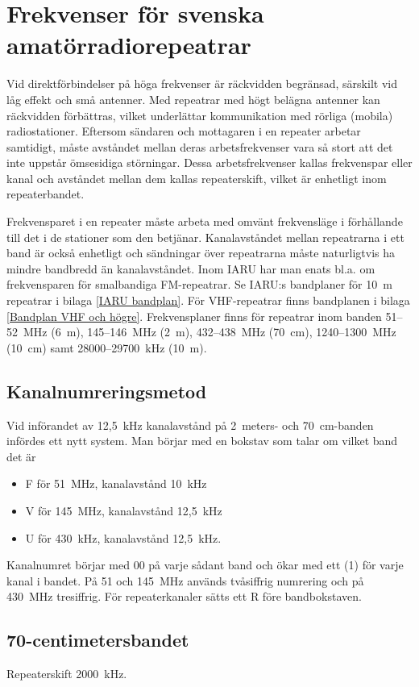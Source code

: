 \chapter[Svenska repeatrar]{Frekvenser för svenska amatörradiorepeatrar}
\label{svenska repeatrar}

Vid direktförbindelser på höga frekvenser är räckvidden begränsad,
särskilt vid låg effekt och små antenner.
Med repeatrar med högt belägna antenner kan räckvidden förbättras,
vilket underlättar kommunikation med rörliga (mobila) radiostationer.
Eftersom sändaren och mottagaren i en repeater arbetar samtidigt, måste
avståndet mellan deras arbetsfrekvenser vara så stort att det inte uppstår
ömsesidiga störningar.
Dessa arbetsfrekvenser kallas frekvenspar eller kanal och avståndet mellan dem
kallas repeaterskift, vilket är enhetligt inom repeaterbandet.

Frekvensparet i en repeater måste arbeta med omvänt frekvensläge i förhållande
till det i de stationer som den betjänar.
Kanalavståndet mellan repeatrarna i ett band är också enhetligt och sändningar
över repeatrarna måste naturligtvis ha mindre bandbredd än kanalavståndet.
Inom IARU har man enats bl.a. om frekvensparen för smalbandiga FM-repeatrar.
Se IARU:s bandplaner för 10~m repeatrar i bilaga \ref{IARU bandplan}.
För VHF-repeatrar finns bandplanen i bilaga \ref{Bandplan VHF och högre}.
Frekvensplaner finns för repeatrar inom banden 51--52~MHz (6~m), 145--146~MHz
(2~m), 432--438~MHz (70~cm), 1240--1300~MHz (10~cm) samt 28000--29700~kHz (10~m).

\section{Kanalnumreringsmetod}
Vid införandet av 12,5~kHz kanalavstånd på 2~meters- och 70~cm-banden infördes
ett nytt system.
Man börjar med en bokstav som talar om vilket band det är
\begin{itemize}
  \item F för 51~MHz, kanalavstånd 10~kHz
  \item V för 145~MHz, kanalavstånd 12,5~kHz
  \item U för 430~kHz, kanalavstånd 12,5~kHz.
\end{itemize}
Kanalnumret börjar med 00 på varje sådant band och ökar med ett (1) för varje
kanal i bandet.
På 51 och 145~MHz används tvåsiffrig numrering och på 430~MHz tresiffrig.
För repeaterkanaler sätts ett R före bandbokstaven.

\section{70-centimetersbandet}
Repeaterskift 2000~kHz.

